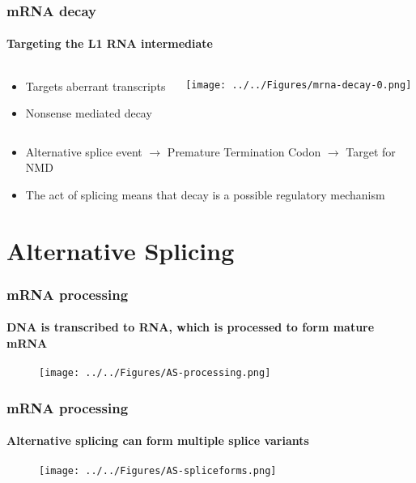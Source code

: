 \documentclass{beamer}
\begin{document}
		\begin{frame} %
			
			\frametitle{mRNA decay}
			\framesubtitle{Targeting the L1 RNA intermediate}
			\begin{columns}
				\begin{column}{0.5\linewidth}
			\begin{itemize}
				\item Targets aberrant transcripts
				\item Nonsense mediated decay 
				
				
			\end{itemize}
				\end{column}
				\begin{column}{0.5\linewidth}
					\texttt{[image: ../../Figures/mrna-decay-0.png]}
				\end{column}
			\end{columns}
			\begin{itemize}
				\item Alternative splice event $\rightarrow$ Premature Termination Codon $\rightarrow$ Target for NMD
				\item The act of splicing means that decay is a possible regulatory mechanism
			\end{itemize}
		\end{frame}	
		
			\section[Alternative Splicing]{Alternative Splicing}
			
		\begin{frame} %
			\frametitle{mRNA processing}
			\framesubtitle{DNA is transcribed to RNA, which is processed to form mature mRNA}
				
				\begin{figure}
					\centering
					\texttt{[image: ../../Figures/AS-processing.png]}
				\end{figure}
			
		\end{frame}	
		
		\begin{frame} %
			\frametitle{mRNA processing}
			\framesubtitle{Alternative splicing can form multiple splice variants}
			
			\begin{figure}
				\centering
				\texttt{[image: ../../Figures/AS-spliceforms.png]}
			\end{figure}
			
		\end{frame}
		
\end{document}
